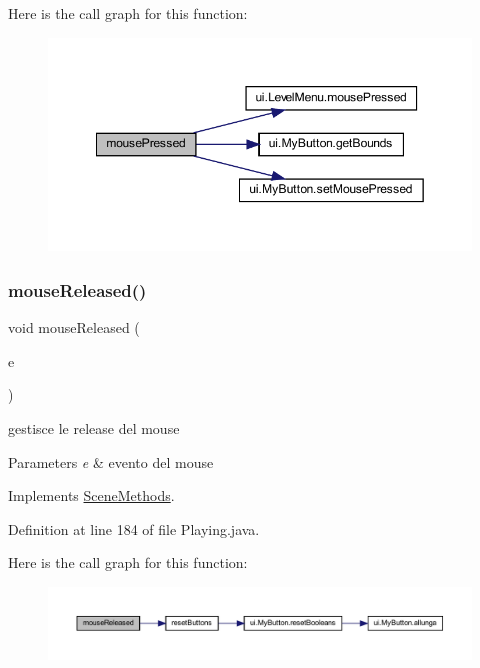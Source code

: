 Here is the call graph for this function\+:\nopagebreak
\begin{figure}[H]
\begin{center}
\leavevmode
\includegraphics[width=349pt]{classscenes_1_1_playing_aed82e1ce3dd3cf283d508c3ba3be70ef_cgraph}
\end{center}
\end{figure}
\mbox{\label{classscenes_1_1_playing_a87a07291794e15052db67f945d90853e}} 
\subsubsection{\texorpdfstring{mouse\+Released()}{mouseReleased()}}
{\footnotesize\ttfamily void mouse\+Released (\begin{DoxyParamCaption}\item[{Mouse\+Event}]{e }\end{DoxyParamCaption})}



gestisce le release del mouse 


\begin{DoxyParams}{Parameters}
{\em e} & evento del mouse \\
\hline
\end{DoxyParams}


Implements \hyperlink{interfacescenes_1_1_scene_methods_a87a07291794e15052db67f945d90853e}{Scene\+Methods}.



Definition at line 184 of file Playing.\+java.

Here is the call graph for this function\+:\nopagebreak
\begin{figure}[H]
\begin{center}
\leavevmode
\includegraphics[width=350pt]{classscenes_1_1_playing_a87a07291794e15052db67f945d90853e_cgraph}
\end{center}
\end{figure}
\mbox{\label{classscenes_1_1_playing_a203b6ad9d5e4d54dd1152986eec4dedc}} 
